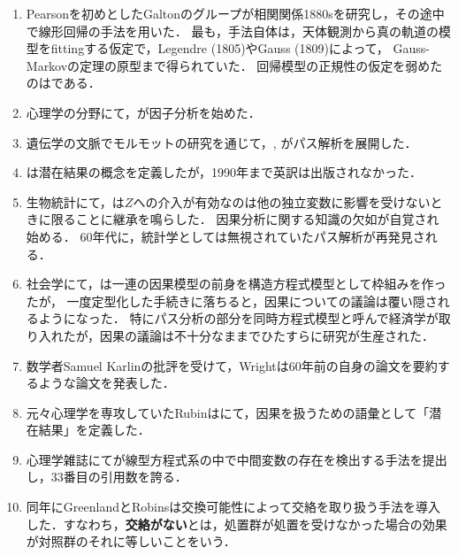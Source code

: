 \documentclass[uplatex,dvipdfmx]{jsreport}
\begin{document}
\begin{history}\mbox{}
    \begin{enumerate}
        \item Pearsonを初めとしたGaltonのグループが相関関係1880sを研究し，その途中で線形回帰の手法を用いた．
        最も，手法自体は，天体観測から真の軌道の模型をfittingする仮定で，Legendre (1805)やGauss (1809)によって，
        Gauss-Markovの定理の原型まで得られていた．
        回帰模型の正規性の仮定を弱めたのは\cite{Fisher22-Regression}である．
        \item 心理学の分野にて，\cite{Spearman04}が因子分析を始めた．
        \item 遺伝学の文脈でモルモットの研究を通じて，\cite{Wright18}, \cite{Wright21}がパス解析を展開した．
        \item \cite{Neyman-23}は潜在結果の概念を定義したが，1990年まで英訳は出版されなかった．
        \item 生物統計にて，\cite{Cox58}は$Z$への介入が有効なのは他の独立変数に影響を受けないときに限ることに継承を鳴らした．
        因果分析に関する知識の欠如が自覚され始める．
        60年代に，統計学としては無視されていたパス解析が再発見される．
        \item 社会学にて，\cite{Joreskog70}は一連の因果模型の前身を構造方程式模型として枠組みを作ったが，
        一度定型化した手続きに落ちると，因果についての議論は覆い隠されるようになった．
        特にパス分析の部分を同時方程式模型と呼んで経済学が取り入れたが，因果の議論は不十分なままでひたすらに研究が生産された．
        \item 数学者Samuel Karlinの批評を受けて，Wrightは60年前の自身の論文を要約するような論文を発表した．
        \item 元々心理学を専攻していたRubinは\cite{Rubin74-Causal}にて，因果を扱うための語彙として「潜在結果」を定義した．
        \item 心理学雑誌にて\cite{Baron-Kenny86}が線型方程式系の中で中間変数の存在を検出する手法を提出し，33番目の引用数を誇る．
        \item 同年にGreenlandとRobinsは交換可能性によって交絡を取り扱う手法を導入した．すなわち，\textbf{交絡がない}とは，処置群が処置を受けなかった場合の効果が対照群のそれに等しいことをいう．
    \end{enumerate}
\end{history}
\end{document}

